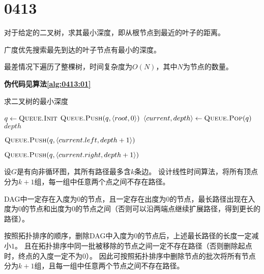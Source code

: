 \section{0413}\label{sec:0413}
\begin{questions}\label{qset:0413}

    \question 对于给定的二叉树，求其最小深度，即从根节点到最近的叶子的距离。

    \begin{solution}
        广度优先搜索最先到达的叶子节点有最小的深度。

        最差情况下遍历了整棵树，时间复杂度为$O(N)$，其中$N$为节点的数量。

        \textbf{伪代码见算法\ref{alg:0413:01}}
    \end{solution}

    \begin{algorithm}[!htp]
        \caption{求二叉树的最小深度} \label{alg:0413:01}
        \begin{algorithmic}[1]
            \State $q \gets \Call{Queue.Init}{}$
            \State $\Call{Queue.Push}{q, \langle root, 0 \rangle}$
            \State $\langle current, depth \rangle \gets \Call{Queue.Pop}{q}$
             
            \State \Return $depth$ 
            \EndIf

             
            \State $\Call{Queue.Push}{q, \langle current.left, depth+1 \rangle}$
            \EndIf

             
            \State $\Call{Queue.Push}{q, \langle current.right, depth+1 \rangle}$
            \EndIf
            \EndWhile
        \end{algorithmic}
    \end{algorithm}


    \question 设$G$是有向非循环图，其所有路径最多含$k$条边。
    设计线性时间算法，将所有顶点分为$k+1$组，每一组中任意两个点之间不存在路径。

    \begin{solution}
        DAG中一定存在入度为$0$的节点，且一定存在出度为$0$的节点，最长路径出现在入度为$0$的节点和出度为$0$的节点之间（否则可以沿两端点继续扩展路径，得到更长的路径）。

        按照拓扑排序的顺序，删除DAG中入度为$0$的节点后，上述最长路径的长度一定减小$1$。
        且在拓扑排序中同一批被移除的节点之间一定不存在路径（否则删除起点时，终点的入度一定不为0）。
        因此可按照拓扑排序中删除节点的批次将所有节点分为$k+1$组，且每一组中任意两个节点之间不存在路径。


\end{solution}
\end{questions}

